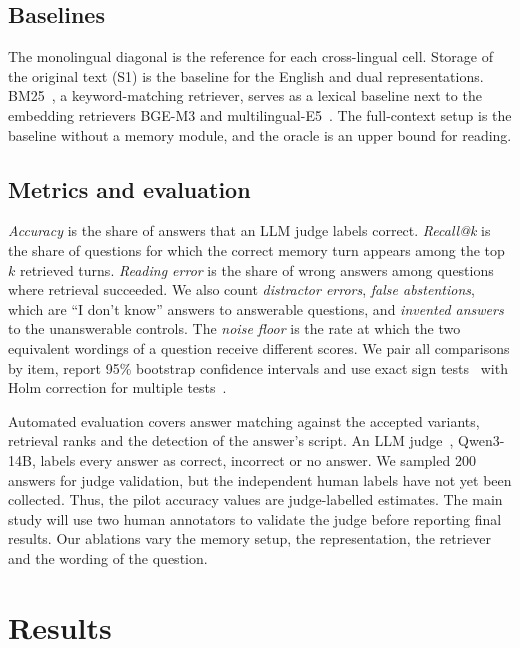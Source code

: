 \documentclass[11pt]{article}
\begin{document}
\subsection{Baselines}
The monolingual diagonal is the reference for each cross-lingual cell.
Storage of the original text (S1) is the baseline for the English and dual representations.
BM25~\citep{robertson2009bm25}, a keyword-matching retriever, serves as a lexical baseline next to the embedding retrievers BGE-M3 and multilingual-E5~\citep{wang2024me5}.
The full-context setup is the baseline without a memory module, and the oracle is an upper bound for reading.

\subsection{Metrics and evaluation}
\emph{Accuracy} is the share of answers that an LLM judge labels correct.
\emph{Recall@k} is the share of questions for which the correct memory turn appears among the top $k$ retrieved turns.
\emph{Reading error} is the share of wrong answers among questions where retrieval succeeded.
We also count \emph{distractor errors}, \emph{false abstentions}, which are ``I don't know'' answers to answerable questions, and \emph{invented answers} to the unanswerable controls.
The \emph{noise floor} is the rate at which the two equivalent wordings of a question receive different scores.
We pair all comparisons by item, report 95\% bootstrap confidence intervals and use exact sign tests~\citep{mcnemar1947} with Holm correction for multiple tests~\citep{holm1979}.

Automated evaluation covers answer matching against the accepted variants, retrieval ranks and the detection of the answer's script.
An LLM judge~\citep{zheng2023judging}, Qwen3-14B, labels every answer as correct, incorrect or no answer.
We sampled 200 answers for judge validation, but the independent human labels have not yet been collected.
Thus, the pilot accuracy values are judge-labelled estimates.
The main study will use two human annotators to validate the judge before reporting final results.
Our ablations vary the memory setup, the representation, the retriever and the wording of the question.

\section{Results}
\label{sec:results}
\end{document}
